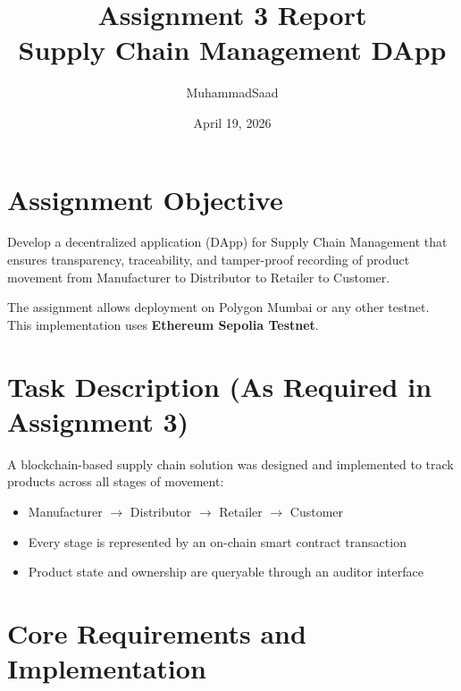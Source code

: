 \documentclass[12pt,a4paper]{article}
\title{Assignment 3 Report\\Supply Chain Management DApp}
\author{MuhammadSaad}
\date{April 19, 2026}
\begin{document}
\maketitle
\thispagestyle{empty}
\newpage

\section{Assignment Objective}
Develop a decentralized application (DApp) for Supply Chain Management that ensures transparency, traceability, and tamper-proof recording of product movement from Manufacturer to Distributor to Retailer to Customer.

The assignment allows deployment on Polygon Mumbai or any other testnet. This implementation uses \textbf{Ethereum Sepolia Testnet}.

\section{Task Description (As Required in Assignment 3)}
A blockchain-based supply chain solution was designed and implemented to track products across all stages of movement:
\begin{itemize}[leftmargin=*]
    \item Manufacturer $\rightarrow$ Distributor $\rightarrow$ Retailer $\rightarrow$ Customer
    \item Every stage is represented by an on-chain smart contract transaction
    \item Product state and ownership are queryable through an auditor interface
\end{itemize}

\section{Core Requirements and Implementation}
\end{document}
